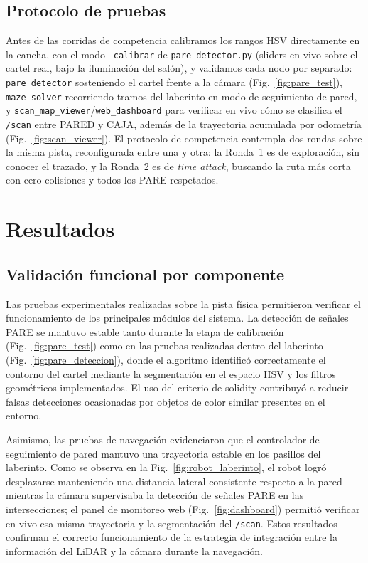 \documentclass[conference]{IEEEtran}
\begin{document}
\subsection{Protocolo de pruebas}
Antes de las corridas de competencia calibramos los rangos HSV directamente en la cancha, con el modo \texttt{--calibrar} de \texttt{pare\_detector.py} (sliders en vivo sobre el cartel real, bajo la iluminación del salón), y validamos cada nodo por separado: \texttt{pare\_detector} sosteniendo el cartel frente a la cámara (Fig.~\ref{fig:pare_test}), \texttt{maze\_solver} recorriendo tramos del laberinto en modo de seguimiento de pared, y \texttt{scan\_map\_viewer}/\texttt{web\_dashboard} para verificar en vivo cómo se clasifica el \texttt{/scan} entre PARED y CAJA, además de la trayectoria acumulada por odometría (Fig.~\ref{fig:scan_viewer}). El protocolo de competencia contempla dos rondas sobre la misma pista, reconfigurada entre una y otra: la Ronda~1 es de exploración, sin conocer el trazado, y la Ronda~2 es de \emph{time attack}, buscando la ruta más corta con cero colisiones y todos los PARE respetados.

\section{Resultados}

\subsection{Validación funcional por componente}
Las pruebas experimentales realizadas sobre la pista física permitieron verificar el funcionamiento de los principales módulos del sistema. La detección de señales PARE se mantuvo estable tanto durante la etapa de calibración (Fig.~\ref{fig:pare_test}) como en las pruebas realizadas dentro del laberinto (Fig.~\ref{fig:pare_deteccion}), donde el algoritmo identificó correctamente el contorno del cartel mediante la segmentación en el espacio HSV y los filtros geométricos implementados. El uso del criterio de solidity contribuyó a reducir falsas detecciones ocasionadas por objetos de color similar presentes en el entorno.

Asimismo, las pruebas de navegación evidenciaron que el controlador de seguimiento de pared mantuvo una trayectoria estable en los pasillos del laberinto. Como se observa en la Fig.~\ref{fig:robot_laberinto}, el robot logró desplazarse manteniendo una distancia lateral consistente respecto a la pared mientras la cámara supervisaba la detección de señales PARE en las intersecciones; el panel de monitoreo web (Fig.~\ref{fig:dashboard}) permitió verificar en vivo esa misma trayectoria y la segmentación del \texttt{/scan}. Estos resultados confirman el correcto funcionamiento de la estrategia de integración entre la información del LiDAR y la cámara durante la navegación.
\end{document}

